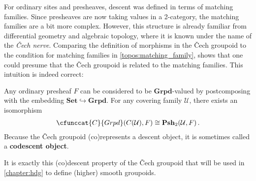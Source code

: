    For ordinary sites and presheaves, descent was defined in terms of matching families. Since presheaves are now taking values in a 2-category, the matching families are a bit more complex. However, this structure is already familiar from differential geometry and algebraic topology, where it is known under the name of the \textit{\v{C}ech nerve}.
    Comparing the definition of morphisms in the \v{C}ech groupoid to the condition for matching families in \cref{topos:matching_family}, shows that one could presume that the \v{C}ech groupoid is related to the matching families. This intuition is indeed correct:
    \begin{property}\label{topos:cech_matching_families}
        Any ordinary presheaf $F$ can be considered to be $\mathbf{Grpd}$-valued by postcomposing with the embedding $\mathbf{Set}\hookrightarrow\mathbf{Grpd}$. For any covering family $\mathcal{U}$, there exists an isomorphism
        \begin{gather}
            \cfunccat{C}{Grpd}(C(\mathcal{U}),F)\cong\mathbf{Psh}_2(\mathcal{U},F)\,.
        \end{gather}
        Because the \v{C}ech groupoid (co)represents a descent object, it is sometimes called a \textbf{codescent object}.
    \end{property}
    It is exactly this (co)descent property of the \v{C}ech groupoid that will be used in \cref{chapter:hdg} to define (higher) smooth groupoids.

